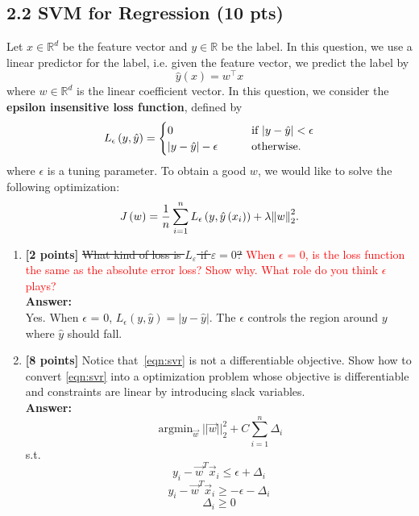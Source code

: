 \documentclass{article}
\DeclareMathOperator*{\argmin}{\mathrm{argmin}}
\begin{document}
\subsection*{2.2 SVM for Regression (10 pts)}
Let $x \in \mathbb{R}^d$ be the feature vector and $y \in \mathbb{R}$ be the label.
In this question, we use a linear predictor for the label, i.e. given the feature vector, we predict the label by \[
\hat{y}\left(x\right) = w^\top x
\] where $w \in\mathbb{R}^d$ is the linear coefficient vector.
In this question, we consider the \textbf{epsilon insensitive loss function}, defined by\begin{align*}
L_{\epsilon}\left(y,\hat{y}\right) = \begin{cases}
0 \qquad &\text{if } \abs{y-\hat{y}} < \epsilon \\
\abs{y-\hat{y}} - \epsilon \qquad &\text{otherwise}.
\end{cases}
\end{align*} where $\epsilon$ is a tuning parameter.
To obtain a good $w$, we would like to solve the following optimization:
\begin{align}
J\left(w\right) = \frac{1}{n}\sum_{i=1}^{n}L_\epsilon\left(y,\hat{y}\left(x_i\right)\right) + \lambda\norm{w}_2^2. \label{eqn:svr}
\end{align}
\begin{enumerate}
\item\textbf{[2 points]} \sout{What kind of loss is $L_ε$ if $ε = 0$?} \textcolor{red}{ When $\epsilon$ = 0, is the loss function the same as the absolute error loss? Show why. What role do you think $\epsilon$ plays?}  \\
\textbf{Answer:}\\
Yes. When $\epsilon$ = 0, $L_\epsilon(y,\hat{y})=|y-\hat{y}|$. The $\epsilon$ controls the region around $y$ where $\hat{y}$ should fall.



\item\textbf{[8 points]} Notice that~\eqref{eqn:svr} is not a differentiable objective.
Show how to convert \eqref{eqn:svr} into a optimization problem whose objective is differentiable and constraints are linear by introducing slack variables. \\

\textbf{Answer:}\\

$$\argmin_{\vec{w}} ||\vec{w}||_2^2 + C\sum_{i=1}^{n}\Delta_i$$
s.t.
$$y_i-\vec{w}^T\vec{x}_i \leq \epsilon+\Delta_i$$
$$y_i-\vec{w}^T\vec{x}_i \geq -\epsilon-\Delta_i$$
$$\Delta_i\geq0$$


\end{enumerate}
\end{document}
